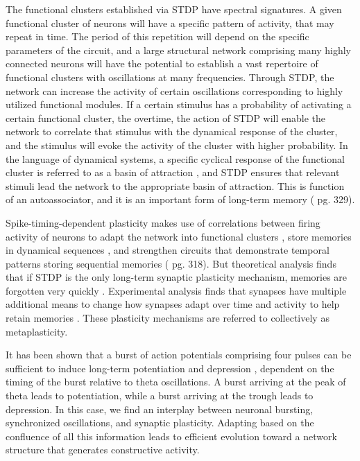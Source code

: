 The functional clusters established via STDP have spectral signatures. A given functional cluster of neurons will have a specific pattern of activity, that may repeat in time. The period of this repetition will depend on the specific parameters of the circuit, and a large structural network comprising many highly connected neurons will have the potential to establish a vast repertoire of functional clusters with oscillations at many frequencies. Through STDP, the network can increase the activity of certain oscillations corresponding to highly utilized functional modules. If a certain stimulus has a probability of activating a certain functional cluster, the overtime, the action of STDP will enable the network to correlate that stimulus with the dynamical response of the cluster, and the stimulus will evoke the activity of the cluster with higher probability. In the language of dynamical systems, a specific cyclical response of the functional cluster is referred to as a basin of attraction \cite{iz2007,st2015}, and STDP ensures that relevant stimuli lead the network to the appropriate basin of attraction. This is function of an autoassociator, and it is an important form of long-term memory (\cite{bu2006} pg. 329).

Spike-timing-dependent plasticity makes use of correlations between firing activity of neurons to adapt the network into functional clusters \cite{shki2006}, store memories in dynamical sequences \cite{haah2015}, and strengthen circuits that demonstrate temporal patterns storing sequential memories (\cite{bu2006} pg. 318). But theoretical analysis finds that if STDP is the only long-term synaptic plasticity mechanism, memories are forgotten very quickly \cite{fuab2007}. Experimental analysis finds that synapses have multiple additional means to change how synapses adapt over time and activity to help retain memories \cite{ab2008}. These plasticity mechanisms are referred to collectively as metaplasticity.

It has been shown that a burst of action potentials comprising four pulses can be sufficient to induce long-term potentiation and depression \cite{huli1995}, dependent on the timing of the burst relative to theta oscillations. A burst arriving at the peak of theta leads to potentiation, while a burst arriving at the trough leads to depression. In this case, we find an interplay between neuronal bursting, synchronized oscillations, and synaptic plasticity. Adapting based on the confluence of all this information leads to efficient evolution toward a network structure that generates constructive activity.

